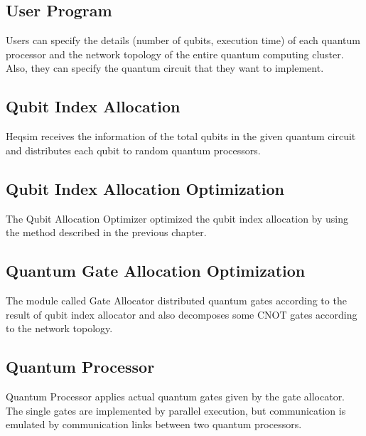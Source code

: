 \subsection{User Program}

Users can specify the details (number of qubits, execution time) of each quantum processor and the network topology of the entire quantum computing cluster.  Also, they can specify the quantum circuit that they want to implement.

\subsection{Qubit Index Allocation}

Heqsim receives the information of the total qubits in the given quantum circuit and distributes each qubit to random quantum processors. 

\subsection{Qubit Index Allocation Optimization}

The Qubit Allocation Optimizer optimized the qubit index allocation by using the method described in the previous chapter.

\subsection{Quantum Gate Allocation Optimization}

The module called Gate Allocator distributed quantum gates according to the result of qubit index allocator and also decomposes some CNOT gates according to the network topology.

\subsection{Quantum Processor}

Quantum Processor applies actual quantum gates given by the gate allocator.  The single gates are implemented by parallel execution, but communication is emulated by communication links between two quantum processors.
